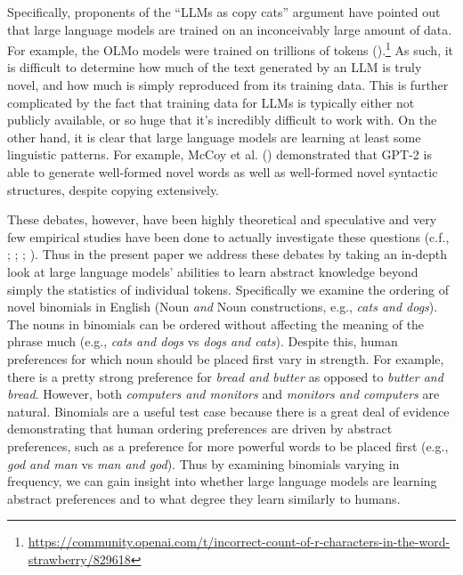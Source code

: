 \documentclass[
  12pt,
  letterpaper,
]{scrreprt}
\begin{document}
Specifically, proponents of the ``LLMs as copy cats'' argument have
pointed out that large language models are trained on an inconceivably
large amount of data. For example, the OLMo models were trained on
trillions of tokens
().\footnote{\url{https://community.openai.com/t/incorrect-count-of-r-characters-in-the-word-strawberry/829618}}
As such, it is difficult to determine how much of the text generated by
an LLM is truly novel, and how much is simply reproduced from its
training data. This is further complicated by the fact that training
data for LLMs is typically either not publicly available, or so huge
that it's incredibly difficult to work with. On the other hand, it is
clear that large language models are learning at least some linguistic
patterns. For example, McCoy et al.
() demonstrated that GPT-2
is able to generate well-formed novel words as well as well-formed novel
syntactic structures, despite copying extensively.

These debates, however, have been highly theoretical and speculative and
very few empirical studies have been done to actually investigate these
questions (c.f., ;
; ;
). Thus in the
present paper we address these debates by taking an in-depth look at
large language models' abilities to learn abstract knowledge beyond
simply the statistics of individual tokens. Specifically we examine the
ordering of novel binomials in English (Noun \emph{and} Noun
constructions, e.g., \emph{cats and dogs}). The nouns in binomials can
be ordered without affecting the meaning of the phrase much (e.g.,
\emph{cats and dogs} vs \emph{dogs and cats}). Despite this, human
preferences for which noun should be placed first vary in strength. For
example, there is a pretty strong preference for \emph{bread and butter}
as opposed to \emph{butter and bread}. However, both \emph{computers and
monitors} and \emph{monitors and computers} are natural. Binomials are a
useful test case because there is a great deal of evidence demonstrating
that human ordering preferences are driven by abstract preferences, such
as a preference for more powerful words to be placed first (e.g.,
\emph{god and man} vs \emph{man and god}). Thus by examining binomials
varying in frequency, we can gain insight into whether large language
models are learning abstract preferences and to what degree they learn
similarly to humans.
\end{document}

